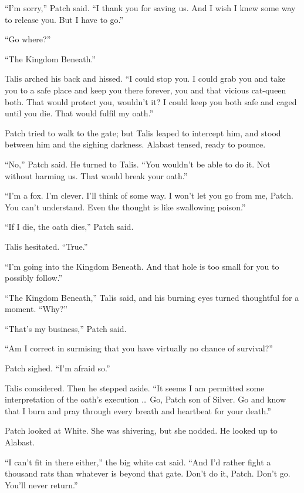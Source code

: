 \documentclass[ebook,oneside,openany,17pt]{memoir}
\newenvironment{tolerant}[1]{%
  \par\tolerance=#1\relax
}{%
  \par
}
\begin{document}
“I’m sorry,” Patch said. “I thank you for saving us. And I wish I knew
some way to release you. But I have to go.”

“Go where?”

“The Kingdom Beneath.”

Talis arched his back and hissed. “I could stop you. I could grab you
and take you to a safe place and keep you there forever, you and that
vicious cat-queen both. That would protect you, wouldn’t it? I could
keep you both safe and caged until you die. That would fulfil my
oath.”

Patch tried to walk to the gate; but Talis leaped to intercept him,
and stood between him and the sighing darkness. Alabast tensed, ready
to pounce.

\begin{tolerant}{2000}
“No,” Patch said. He turned to Talis. “You wouldn’t be able to do
it. Not without harming us. That would break your oath.”
\end{tolerant}

“I’m a fox. I’m clever. I’ll think of some way. I won’t let you go
from me, Patch. You can’t understand. Even the thought is like
swallowing poison.”

“If I die, the oath dies,” Patch said.

Talis hesitated. “True.”

“I’m going into the Kingdom Beneath. And that hole is too small for
you to possibly follow.”

“The Kingdom Beneath,” Talis said, and his burning eyes turned
thoughtful for a moment. “Why?”

“That’s my business,” Patch said.

“Am I correct in surmising that you have virtually no chance of
survival?”

Patch sighed. “I’m afraid so.”

\begin{tolerant}{1000}
Talis considered. Then he stepped aside. “It seems I am permitted some
interpretation of the oath’s execution … Go, Patch son of Silver. Go
and know that I burn and pray through every breath and heartbeat for
your death.”
\end{tolerant}

Patch looked at White. She was shivering, but she nodded. He looked up
to Alabast.

“I can’t fit in there either,” the big white cat said. “And I’d rather
fight a thousand rats than whatever is beyond that gate. Don’t do it,
Patch. Don’t go. You’ll never return.”
\end{document}
